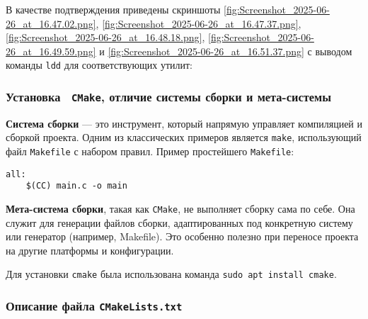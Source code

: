 В качестве подтверждения приведены скриншоты \ref{fig:Screenshot_2025-06-26_at_16.47.02.png}, \ref{fig:Screenshot_2025-06-26_at_16.47.37.png}, \ref{fig:Screenshot_2025-06-26_at_16.48.18.png}, \ref{fig:Screenshot_2025-06-26_at_16.49.59.png} и \ref{fig:Screenshot_2025-06-26_at_16.51.37.png} с выводом команды \texttt{ldd} для соответствующих утилит:






\subsubsection{Установка  \texttt{CMake}, отличие системы сборки и мета-системы}

\textbf{Система сборки} — это инструмент, который напрямую управляет компиляцией и сборкой проекта. Одним из классических примеров является \texttt{make}, использующий файл \texttt{Makefile} с набором правил. Пример простейшего \texttt{Makefile}:

\begin{verbatim}
all:
	$(CC) main.c -o main
\end{verbatim}

\textbf{Мета-система сборки}, такая как \texttt{CMake}, не выполняет сборку сама по себе. Она служит для генерации файлов сборки, адаптированных под конкретную систему или генератор (например, Makefile). Это особенно полезно при переносе проекта на другие платформы и конфигурации.

Для установки \texttt{cmake} была использована команда \texttt{sudo apt install cmake}.


\subsubsection*{Описание файла \texttt{CMakeLists.txt}}

